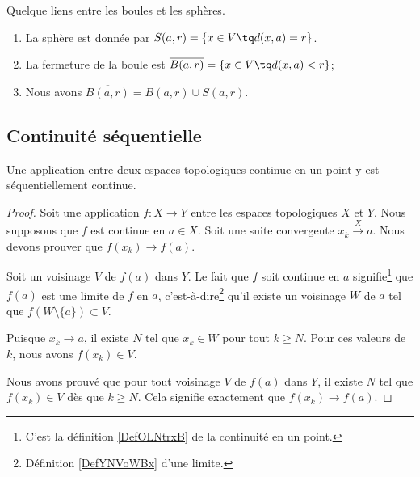 \begin{lemma}       \label{LEMooDYYYooHZitMZ}
    Quelque liens entre les boules et les sphères.
    \begin{enumerate}
        \item
		   La sphère est donnée par $S(a,r)=\{ x\in V\tq d(x,a)=r \}$.
		\item
            La fermeture de la boule est $\overline{ B(a,r) }=\{ x\in V\tq d(x,a)<r \}$;
        \item
            Nous avons \( \overline{ B(a,r) }=B(a,r)\cup S(a,r)\).
    \end{enumerate}
\end{lemma}

\subsection{Continuité séquentielle}

\begin{corollary}		\label{PropFnContParSuite}
	Une application entre deux espaces topologiques continue en un point y est séquentiellement continue.
\end{corollary}

\begin{proof}
	Soit une application \( f\colon X\to Y\) entre les espaces topologiques \( X\) et \( Y\). Nous supposons que \( f\) est continue en \( a\in X\). Soit une suite convergente \( x_k\stackrel{X}{\longrightarrow}a\). Nous devons prouver que \( f(x_k)\to f(a)\).

	Soit un voisinage \( V\) de \( f(a)\) dans \( Y\). Le fait que \( f\) soit continue en \( a\) signifie\footnote{C'est la définition \ref{DefOLNtrxB} de la continuité en un point.} que \( f(a)\) est une limite de \( f\) en \( a\), c'est-à-dire\footnote{Définition \ref{DefYNVoWBx} d'une limite.} qu'il existe un voisinage \( W\) de \( a\) tel que \( f(W\setminus\{ a \})\subset V\).

	Puisque \( x_k\to a\), il existe \( N\) tel que \( x_k\in W\) pour tout \( k\geq N\). Pour ces valeurs de \( k\), nous avons \( f(x_k)\in V\).

	Nous avons prouvé que pour tout voisinage \( V\) de \( f(a)\) dans \( Y\), il existe \( N\) tel que \( f(x_k)\in V\) dès que \( k\geq N\). Cela signifie exactement que \( f(x_k)\to f(a)\).
\end{proof}

